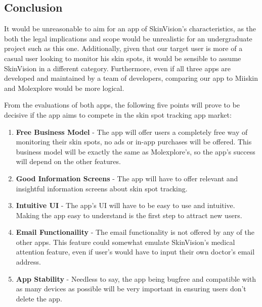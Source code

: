 \subsection{Conclusion}
It would be unreasonable to aim for an app of SkinVision's characteristics, as the both the legal implications and scope would be unrealistic for an undergraduate project such as this one. Additionally, given that our target user is more of a casual user looking to monitor his skin spots, it would be sensible to assume SkinVision in a different category. Furthermore, even if all three apps are developed and maintained by a team of developers, comparing our app to Miiskin and Molexplore would be more logical.

From the evaluations of both apps, the following five points will prove to be decisive if the app aims to compete in the skin spot tracking app market:
\begin{enumerate}
    \item \textbf{Free Business Model} - The app will offer users a completely free way of monitoring their skin spots, no ads or in-app purchases will be offered. This business model will be exactly the same as Molexplore's, so the app's success will depend on the other features.
    \item \textbf{Good Information Screens} - The app will have to offer relevant and insightful information screens about skin spot tracking.
    \item \textbf{Intuitive UI} - The app's UI will have to be easy to use and intuitive. Making the app easy to understand is the first step to attract new users.
    \item \textbf{Email Functionaility} - The email functionality is not offered by any of the other apps. This feature could somewhat emulate SkinVision's medical attention feature, even if user's would have to input their own doctor's email address.
    \item \textbf{App Stability} - Needless to say, the app being bugfree and compatible with as many devices as possible will be very important in ensuring users don't delete the app.
\end{enumerate}

